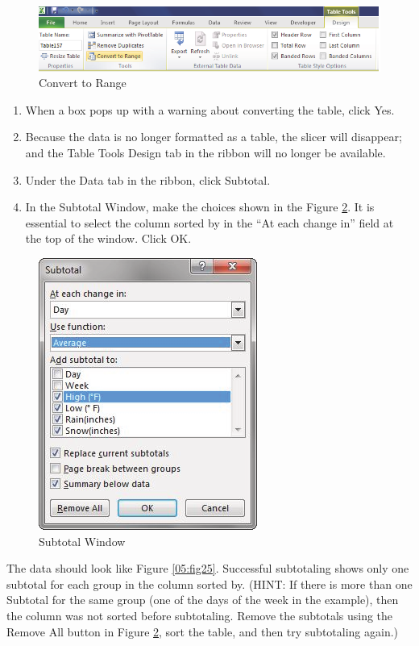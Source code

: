 \begin{figure}[H]
	\centering
	\includegraphics[width=\maxwidth{.95\linewidth}]{gfx/ch05_fig23}
	\caption{Convert to Range}
	\label{05:fig23}
\end{figure}

\begin{enumerate}[resume]
	\item When a box pops up with a warning about converting the table, click Yes.
	\item Because the data is no longer formatted as a table, the slicer will disappear; and the Table Tools Design tab in the ribbon will no longer be available.
	\item Under the Data tab in the ribbon, click Subtotal.
	\item In the Subtotal Window, make the choices shown in the Figure \ref{05:fig24}. It is essential to select the column sorted by in the ``At each change in'' field at the top of the window. Click OK.
\end{enumerate}

\begin{figure}[H]
	\centering
	\includegraphics[width=\maxwidth{.95\linewidth}]{gfx/ch05_fig24}
	\caption{Subtotal Window}
	\label{05:fig24}
\end{figure}

The data should look like Figure \ref{05:fig25}. Successful subtotaling shows only one subtotal for each group in the column sorted by. (HINT: If there is more than one Subtotal for the same group (\ie one of the days of the week in the example), then the column was not sorted before subtotaling. Remove the subtotals using the Remove All button in Figure \ref{05:fig24}, sort the table, and then try subtotaling again.)

